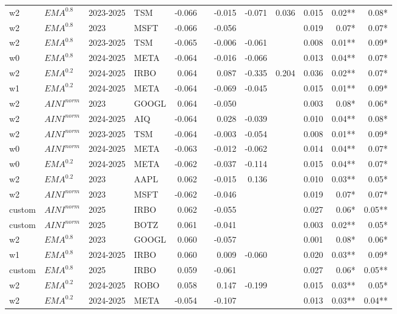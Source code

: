 {\begin{tabularx}{\textwidth}{@{}X@{\hspace{0.5pt}}X@{\hspace{0.5pt}}X@{\hspace{0.5pt}}X@{\hspace{2.0pt}} r r r r r r r r@{}}
w2 & $EMA^{0.8}$ & 2023-2025 & TSM & -0.066 &  & -0.015 & -0.071 & 0.036 & 0.015 & 0.02** & 0.08* \\
w2 & $EMA^{0.8}$ & 2023 & MSFT & -0.066 &  & -0.056 &  &  & 0.019 & 0.07* & 0.07* \\
w2 & $EMA^{0.8}$ & 2023-2025 & TSM & -0.065 &  & -0.006 & -0.061 &  & 0.008 & 0.01** & 0.09* \\
w0 & $EMA^{0.8}$ & 2024-2025 & META & -0.064 &  & -0.016 & -0.066 &  & 0.013 & 0.04** & 0.07* \\
w2 & $EMA^{0.2}$ & 2024-2025 & IRBO & 0.064 &  & 0.087 & -0.335 & 0.204 & 0.036 & 0.02** & 0.07* \\
w1 & $EMA^{0.2}$ & 2024-2025 & META & -0.064 &  & -0.069 & -0.045 &  & 0.015 & 0.01** & 0.09* \\
w2 & $AINI^{norm}$ & 2023 & GOOGL & 0.064 &  & -0.050 &  &  & 0.003 & 0.08* & 0.06* \\
w2 & $AINI^{norm}$ & 2024-2025 & AIQ & -0.064 &  & 0.028 & -0.039 &  & 0.010 & 0.04** & 0.08* \\
w2 & $AINI^{norm}$ & 2023-2025 & TSM & -0.064 &  & -0.003 & -0.054 &  & 0.008 & 0.01** & 0.09* \\
w0 & $AINI^{norm}$ & 2024-2025 & META & -0.063 &  & -0.012 & -0.062 &  & 0.014 & 0.04** & 0.07* \\
w0 & $EMA^{0.2}$ & 2024-2025 & META & -0.062 &  & -0.037 & -0.114 &  & 0.015 & 0.04** & 0.07* \\
w2 & $EMA^{0.2}$ & 2023 & AAPL & 0.062 &  & -0.015 & 0.136 &  & 0.010 & 0.03** & 0.05* \\
w2 & $AINI^{norm}$ & 2023 & MSFT & -0.062 &  & -0.046 &  &  & 0.019 & 0.07* & 0.07* \\
custom & $AINI^{norm}$ & 2025 & IRBO & 0.062 &  & -0.055 &  &  & 0.027 & 0.06* & 0.05** \\
custom & $AINI^{norm}$ & 2025 & BOTZ & 0.061 &  & -0.041 &  &  & 0.003 & 0.02** & 0.05* \\
w2 & $EMA^{0.8}$ & 2023 & GOOGL & 0.060 &  & -0.057 &  &  & 0.001 & 0.08* & 0.06* \\
w1 & $EMA^{0.8}$ & 2024-2025 & IRBO & 0.060 &  & 0.009 & -0.060 &  & 0.020 & 0.03** & 0.09* \\
custom & $EMA^{0.8}$ & 2025 & IRBO & 0.059 &  & -0.061 &  &  & 0.027 & 0.06* & 0.05** \\
w2 & $EMA^{0.2}$ & 2024-2025 & ROBO & 0.058 &  & 0.147 & -0.199 &  & 0.015 & 0.03** & 0.05* \\
w2 & $EMA^{0.2}$ & 2024-2025 & META & -0.054 &  & -0.107 &  &  & 0.013 & 0.03** & 0.04** \\

\end{tabularx}}
